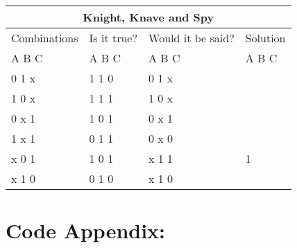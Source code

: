 \documentclass[11pt]{amsart}
\begin{document}
	\begin{tabular}{ |p{3cm}||p{3cm}|p{3cm}|p{3cm}|  }
	 \hline
	 \multicolumn{4}{|c|}{Knight, Knave and Spy} \\
	 \hline
	 Combinations & Is it true? & Would it be said? & Solution  \\ A  B  C   &   A  B  C  &   A  B  C & A  B  C \\
	 \hline
	  0   1   x  	& 1	1	0   & 0 1 x	&  \\
	  1   0   x		& 1	1	1  	& 1 0 x &  \\
	  0   x   1 	&	1	0	1 	& 0 x 1	&  \\
	  1   x   1  	&	0	1	1 	& 0 x 0	&  \\
	  x   0   1		& 1	0	1  	& x 1 1	& 1\\
	  x   1   0		& 0	1	0  	& x 1 0 &  \\

	 \hline
	\end{tabular}


\section{Code Appendix:}
\end{document}
